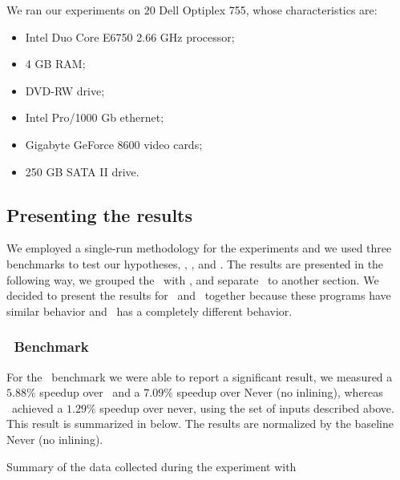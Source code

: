 
We ran our experiments on $20$ Dell Optiplex 755, whose characteristics are:
\begin{itemize}

\item Intel Duo Core E6750 2.66 GHz processor;

\item 4 GB RAM;

\item DVD-RW drive;

\item Intel Pro/1000 Gb ethernet;

\item Gigabyte GeForce 8600 video cards;

\item 250 GB SATA II drive. 

\end{itemize}


\subsection{Presenting the results}

We employed a single-run methodology for the experiments and we used three benchmarks to test our hypotheses, \bzip, \gzip, and \gcc. The results are presented in the following way, we grouped the \bzip\ with \gzip, and separate \gcc\ to another section. We decided to present the results for \bzip\ and \gzip\ together because these programs have similar behavior and \gcc\ has a completely different behavior.

\subsubsection{\Gcc\ Benchmark}

For the \gcc\ benchmark we were able to report a significant result, we measured a $5.88 \%$ speedup over \llvm\, and a $7.09 \%$ speedup over Never (no inlining), whereas \llvm\ achieved a $1.29 \%$ speedup over never, using the set of inputs described above. This result is summarized in  below. The results are normalized by the baseline Never (no inlining).

\begin{table}
  \centering
  \begin{tiny}
  
  \end{tiny}
  \caption{Summary of the data collected during the experiment with \gcc}
  \label{tab:speedupgcc}
\end{table}

